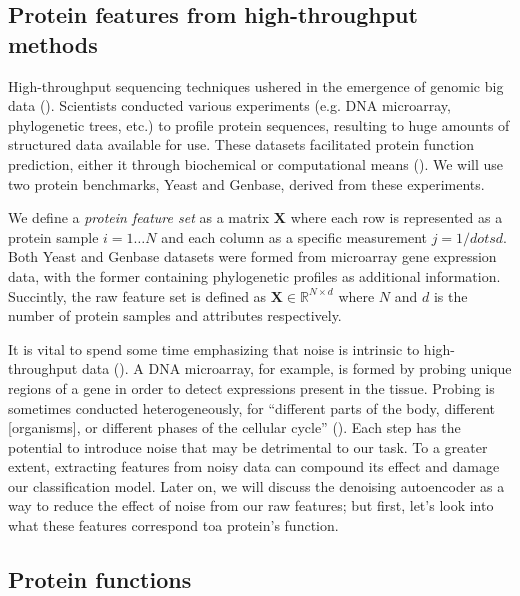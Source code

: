 \subsection{Protein features from high-throughput methods}

\par High-throughput sequencing techniques ushered in the emergence of
genomic big data (\cite{reuter2015high}). Scientists conducted various
experiments (e.g. DNA microarray, phylogenetic trees, etc.) to profile
protein sequences, resulting to huge amounts of structured data available for
use. These datasets facilitated protein function prediction, either it through
biochemical or computational means (\cite{eisenberg2000protein,
marcotte1999combined}). We will use two protein benchmarks,
Yeast and Genbase, derived from these experiments.

\par We define a \textit{protein feature set} as a matrix $\mathbf{X}$ where
each row is represented as a protein sample $i=1\dots N$ and each column as a
specific measurement $j=1/dots d$. Both Yeast and Genbase datasets were
formed from microarray gene expression data, with the former containing
phylogenetic profiles as additional information. Succintly, the raw feature
set is defined as $\mathbf{X} \in \mathbb{R}^{N \times d}$ where $N$ and $d$
is the number of protein samples and attributes respectively.

\par It is vital to spend some time emphasizing that noise is intrinsic to
high-throughput data (\cite{hong2013estimating}). A DNA microarray, for
example, is formed by probing unique regions of a gene in order to detect
expressions present in the tissue. Probing is sometimes conducted
heterogeneously, for ``different parts of the body, different [organisms], or
different phases of the cellular cycle'' (\cite{nguyen2009noise}). Each step
has the potential to introduce noise that may be detrimental to our task. To
a greater extent, extracting features from noisy data can compound its effect
and damage our classification model. Later on, we will discuss the denoising
autoencoder as a way to reduce the effect of noise from our raw features; but
first, let's look into what these features correspond to\textemdash a
protein's function.

\subsection{Protein functions}

